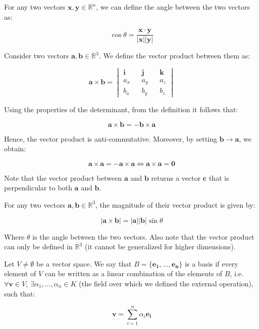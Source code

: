 \documentclass[12pt]{article}
\begin{document}
\begin{proposition}
    For any two vectors $\mathbf{x, y} \in \mathbb{R}^n$, we can define the angle between the two vectors as:

    \[ \cos{\theta} = \frac{\mathbf{x \cdot y}}{\mathbf{|x||y|}} \]
\end{proposition}

\begin{definition}
    Consider two vectors $\mathbf{a, b} \in \mathbb{R}^3$. We define the vector product between them as:

    \[ \mathbf{a} \times \mathbf{b} = \begin{vmatrix}
        \mathbf{i} && \mathbf{j} && \mathbf{k} \\
        a_x && a_y && a_z \\
        b_a && b_y && b_z
    \end{vmatrix} \]
\end{definition}

Using the properties of the determinant, from the definition it follows that:

\[ \mathbf{a \times b = - b \times a} \]

Hence, the vector product is anti-commutative. Moreover, by setting $\mathbf{b} \to \mathbf{a}$, we obtain:

\[ \mathbf{a \times a} = - \mathbf{a \times a} \Leftrightarrow \mathbf{a \times a} = \mathbf{0} \]

Note that the vector product between $\mathbf{a}$ and $\mathbf{b}$ returns a vector $\mathbf{c}$ that is perpendicular to both $\mathbf{a}$ and $\mathbf{b}$.

\begin{theorem}
    For any two vectors $\mathbf{a, b} \in \mathbb{R}^3$, the magnitude of their vector product is given by:

    \[ |\mathbf{a \times b}| = \mathbf{|a||b|}\sin{\theta} \]

    Where $\theta$ is the angle between the two vectors. Also note that the vector product can only be defined in $\mathbb{R}^3$ (it cannot be generalized for higher dimensions).
\end{theorem}

\begin{definition}[Basis]
    Let $V \neq \emptyset$ be a vector space. We say that $B = \{\mathbf{e_1}, \dots, \mathbf{e_n}\}$ is a basis if every element of $V$ can be written as a linear combination of the elements of $B$, i.e. $\forall \mathbf{v} \in V$, $\exists \alpha_1, \dots, \alpha_n \in K$ (the field over which we defined the external operation), such that:

    \[ \mathbf{v} = \sum_{i = 1}^n \alpha_i \mathbf{e_i} \]
\end{definition}
\end{document}
